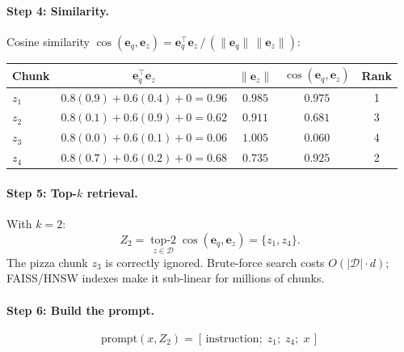 \documentclass[11pt]{article}
\begin{document}
\paragraph{Step 4: Similarity.}
Cosine similarity $\cos(\mathbf{e}_q, \mathbf{e}_z) = \mathbf{e}_q^\top \mathbf{e}_z \,/\, (\lVert\mathbf{e}_q\rVert\,\lVert\mathbf{e}_z\rVert)$:
\begin{center}
\begin{tabular}{@{}lcccc@{}}
\toprule
Chunk & $\mathbf{e}_q^\top \mathbf{e}_z$ & $\lVert \mathbf{e}_z \rVert$ & $\cos(\mathbf{e}_q, \mathbf{e}_z)$ & Rank \\
\midrule
$z_1$ & $0.8(0.9) + 0.6(0.4) + 0 = 0.96$ & $0.985$ & $\mathbf{0.975}$ & 1 \\
$z_2$ & $0.8(0.1) + 0.6(0.9) + 0 = 0.62$ & $0.911$ & $0.681$ & 3 \\
$z_3$ & $0.8(0.0) + 0.6(0.1) + 0 = 0.06$ & $1.005$ & $0.060$ & 4 \\
$z_4$ & $0.8(0.7) + 0.6(0.2) + 0 = 0.68$ & $0.735$ & $\mathbf{0.925}$ & 2 \\
\bottomrule
\end{tabular}
\end{center}

\paragraph{Step 5: Top-$k$ retrieval.}
With $k = 2$:
\begin{equation}
  Z_2 = \operatorname*{top-2}_{z \in \mathcal{D}} \cos(\mathbf{e}_q, \mathbf{e}_z) = \{ z_1, z_4 \}.
\end{equation}
The pizza chunk $z_3$ is correctly ignored. Brute-force search costs $O(|\mathcal{D}| \cdot d)$; FAISS/HNSW indexes make it sub-linear for millions of chunks.

\paragraph{Step 6: Build the prompt.}
\begin{equation}
  \mathrm{prompt}(x, Z_2) = [\,\text{instruction};\; z_1;\; z_4;\; x\,]
\end{equation}
\begin{center}
\end{center}
\end{document}
